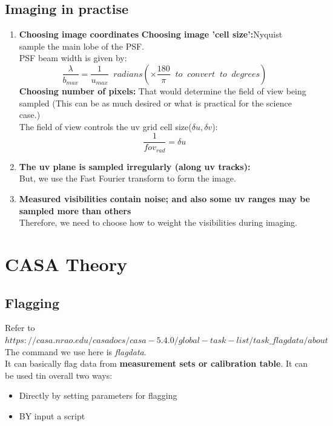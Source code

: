 \documentclass[10pt]{report}
\newcommand{\tbf}[1]{\textbf{#1}}
\newcommand{\tit}[1]{\textit{#1}}
\begin{document}
\subsection{Imaging in practise}
\begin{enumerate}
\item  \tbf{Choosing image coordinates}
\tbf{Choosing image 'cell size':}Nyquist sample the main lobe of the PSF.\\

PSF beam width is given by:
\begin{equation}
\frac{\lambda}{b_{max}}=\frac{1}{u_{max}}\;\;radians(\times \frac{180}{\pi}\;\; to \;\; convert \;\; to \;\; degrees)
\end{equation}
\tbf{Choosing number of pixels:} That would determine the field of view being sampled (This can be as much desired or what is practical for the science case.)\\

The field of view controls the uv grid cell size($\delta u, \delta v$):\\
\begin{equation}
\frac{1}{fov_{rad}}=\delta u
\end{equation}
\item \tbf{The uv plane is sampled irregularly (along uv tracks):}\\
But, we use the Fast Fourier transform to form the image.
\item \tbf{Measured visibilities contain noise; and also some uv ranges may be sampled more than others}\\
Therefore, we need to choose how to weight the visibilities during imaging.

\end{enumerate}
\section{CASA Theory}

\subsection{Flagging}
Refer to $https://casa.nrao.edu/casadocs/casa-5.4.0/global-task-list/task \_flagdata/about$\\

The command we use here is \tit{flagdata}.\\
It can basically flag data from \tbf{measurement sets or calibration table}. It can be used tin overall two ways:
\begin{itemize}
\item Directly by setting parameters for flagging
\item BY input a script
\end{itemize}
\end{document}
